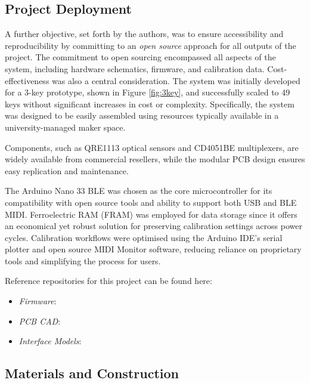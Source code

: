 \subsection{Project Deployment}
A further objective, set forth by the authors, was to ensure accessibility and reproducibility by committing to an \emph{open source} approach for all outputs of the project. The commitment to open sourcing encompassed all aspects of the system, including hardware schematics, firmware, and calibration data. Cost-effectiveness was also a central consideration. The system was initially developed for a 3-key prototype, shown in Figure \ref{fig:3key}, and successfully scaled to 49 keys without significant increases in cost or complexity. Specifically, the system was designed to be easily assembled using resources typically available in a university-managed maker space.

Components, such as QRE1113 optical sensors and CD4051BE multiplexers, are widely available from commercial resellers, while the modular PCB design ensures easy replication and maintenance.

The Arduino Nano 33 BLE was chosen as the core microcontroller for its compatibility with open source tools and ability to support both USB and BLE MIDI. Ferroelectric RAM (FRAM) was employed for data storage since it offers an economical yet robust solution for preserving calibration settings across power cycles. Calibration workflows were optimised using the Arduino IDE’s serial plotter and open source MIDI Monitor software, reducing reliance on proprietary tools and simplifying the process for users. 

Reference repositories for this project can be found here:
\begin{anonsuppress}
    \begin{itemize}
        \item 
        \emph{Firmware}: 
        \item 
        \emph{PCB CAD}: 
        \item 
        \emph{Interface Models}: 
    \end{itemize}
\end{anonsuppress}



\subsection{Materials and Construction}


